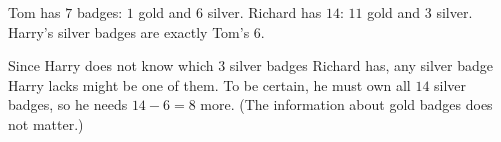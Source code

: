 Tom has $7$ badges: $1$ gold and $6$ silver. Richard has $14$: $11$ gold and $3$ silver. Harry's silver badges are exactly Tom's $6$.

Since Harry does not know which $3$ silver badges Richard has, any silver badge Harry lacks might be one of them. To be certain, he must own all $14$ silver badges, so he needs $14-6=\boxed{8}$ more. (The information about gold badges does not matter.)
